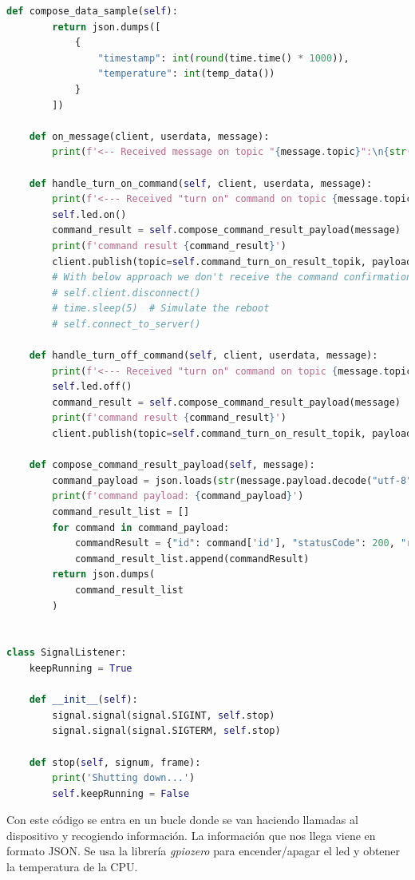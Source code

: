 {\begin{lstlisting}[language=Python]
    def compose_data_sample(self):
        return json.dumps([
            {
                "timestamp": int(round(time.time() * 1000)),
                "temperature": int(temp_data())
            }
        ])

    def on_message(client, userdata, message):
        print(f'<-- Received message on topic "{message.topic}":\n{str(message.payload.decode("utf-8"))}')

    def handle_turn_on_command(self, client, userdata, message):
        print(f'<--- Received "turn on" command on topic {message.topic} \nTurning on...')
        self.led.on()
        command_result = self.compose_command_result_payload(message)
        print(f'command result {command_result}')
        client.publish(topic=self.command_turn_on_result_topik, payload=command_result)
        # With below approach we don't receive the command confirmation on the server side.
        # self.client.disconnect()
        # time.sleep(5)  # Simulate the reboot
        # self.connect_to_server()

    def handle_turn_off_command(self, client, userdata, message):
        print(f'<--- Received "turn on" command on topic {message.topic} \nTurning off...')
        self.led.off()
        command_result = self.compose_command_result_payload(message)
        print(f'command result {command_result}')
        client.publish(topic=self.command_turn_on_result_topik, payload=command_result)

    def compose_command_result_payload(self, message):
        command_payload = json.loads(str(message.payload.decode("utf-8")))
        print(f'command payload: {command_payload}')
        command_result_list = []
        for command in command_payload:
            commandResult = {"id": command['id'], "statusCode": 200, "reasonPhrase": "OK", "payload": "Success"}
            command_result_list.append(commandResult)
        return json.dumps(
            command_result_list
        )


class SignalListener:
    keepRunning = True

    def __init__(self):
        signal.signal(signal.SIGINT, self.stop)
        signal.signal(signal.SIGTERM, self.stop)

    def stop(self, signum, frame):
        print('Shutting down...')
        self.keepRunning = False

\end{lstlisting}

Con este código se entra en un bucle donde se van haciendo llamadas al dispositivo y recogiendo información. La información que nos llega viene en formato JSON. Se usa la librería \textit{gpiozero} para encender/apagar el led y obtener la temperatura de la CPU. 

}
